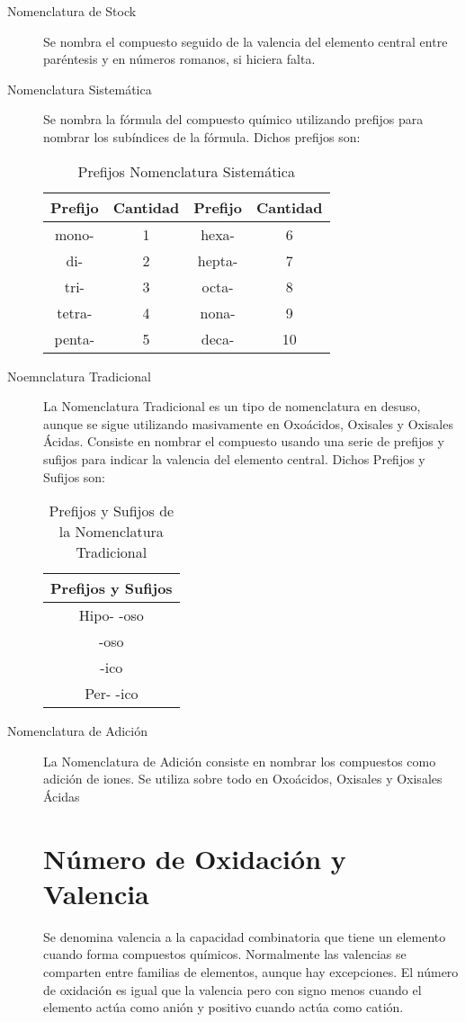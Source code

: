 \documentclass[11pt,fleqn]{book} %
\begin{document}
\begin{description}
	\item [Nomenclatura de Stock] Se nombra el compuesto seguido de la valencia del elemento central entre paréntesis y en números romanos, si hiciera falta.
	\item[Nomenclatura Sistemática] Se nombra la fórmula del compuesto químico utilizando prefijos para nombrar los subíndices de la fórmula. Dichos prefijos son:\\
	\begin{table}[h!]
		\centering
		\label{tab:nomsist}
		\begin{tabular}{c c|c c}
			Prefijo&Cantidad&Prefijo&Cantidad\\ \hline
			mono-&1&hexa-&6\\ 
			di-&2&hepta-&7\\ 
			tri-&3&octa-&8\\ 
			tetra-&4&nona-&9\\
			penta-&5&deca-&10\\ \hline
		\end{tabular}
		\caption{Prefijos Nomenclatura Sistemática}
	\end{table}
	\item[Noemnclatura Tradicional] La Nomenclatura Tradicional es un tipo de nomenclatura en desuso, aunque se sigue utilizando masivamente en Oxoácidos, Oxisales y Oxisales Ácidas. Consiste en nombrar el compuesto usando una serie de prefijos y sufijos para indicar la valencia del elemento central. Dichos Prefijos y Sufijos son:
	\begin{table}[h!]
		\centering
		\label{tab:nomtrad}
		\begin{tabular}{c}
			Prefijos y Sufijos\\ \hline
			Hipo- -oso\\
			-oso\\
			-ico\\
			Per- -ico\\ \hline
		\end{tabular}
	\caption{Prefijos y Sufijos de la Nomenclatura Tradicional}
	\end{table}
	\item[Nomenclatura de Adición] La Nomenclatura de Adición consiste en nombrar los compuestos como adición de iones. Se utiliza sobre todo en Oxoácidos, Oxisales y Oxisales Ácidas
	
\section{Número de Oxidación y Valencia}
	Se denomina valencia a la capacidad combinatoria que tiene un elemento cuando forma compuestos químicos. Normalmente las valencias se comparten entre familias de elementos, aunque  hay excepciones. El número de oxidación es igual que la valencia pero con signo menos cuando el elemento actúa como anión y positivo cuando actúa como catión.

\end{description}
\end{document}

